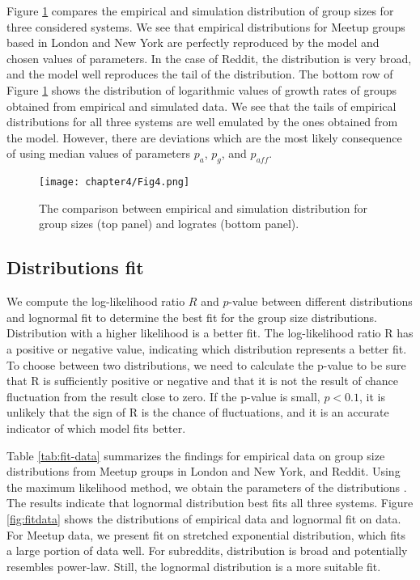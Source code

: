 Figure \ref{fig:fig6} compares the empirical and simulation distribution of group sizes for three considered systems. We see that empirical distributions for Meetup groups based in London and New York are perfectly reproduced by the model and chosen values of parameters. In the case of Reddit, the distribution is very broad, and the model well reproduces the tail of the distribution.
The bottom row of Figure \ref{fig:fig6} shows the distribution of logarithmic values of growth rates of groups obtained from empirical and simulated data. We see that the tails of empirical distributions for all three systems are well emulated by the ones obtained from the model. However, there are deviations which are the most likely consequence of using median values of parameters $p_{a}$, $p_{g}$, and $p_{aff}$.

\begin{figure}[H]
	\centering
	\texttt{[image: chapter4/Fig4.png]}
	\caption[The comparison between empirical and simulated data.]{The comparison between empirical and simulation distribution for group sizes (top panel) and logrates (bottom panel).}
	\label{fig:fig6}
\end{figure}


\subsection{Distributions fit}

We compute the log-likelihood ratio $R$ and $p$-value between different distributions and lognormal fit \cite{clauset2009power} to determine the best fit for the group size distributions. Distribution with a higher likelihood is a better fit. The log-likelihood ratio R has a positive or negative value, indicating which distribution represents a better fit. To choose between two distributions, we need to calculate the p-value to be sure that R is sufficiently positive or negative and that it is not the result of chance fluctuation from the result close to zero. If the p-value is small, $p<0.1$, it is unlikely that the sign of R is the chance of fluctuations, and it is an accurate indicator of which model fits better.

Table \ref{tab:fit-data} summarizes the findings for empirical data on group size distributions from Meetup groups in London and New York, and Reddit. Using the maximum likelihood method, we obtain the parameters of the distributions \cite{power-law}. The results indicate that lognormal distribution best fits all three systems. Figure \ref{fig:fitdata} shows the distributions of empirical data and lognormal fit on data. For Meetup data, we present fit on stretched exponential distribution, which fits a large portion of data well. For subreddits, distribution is broad and potentially resembles power-law. Still, the lognormal distribution is a more suitable fit.

